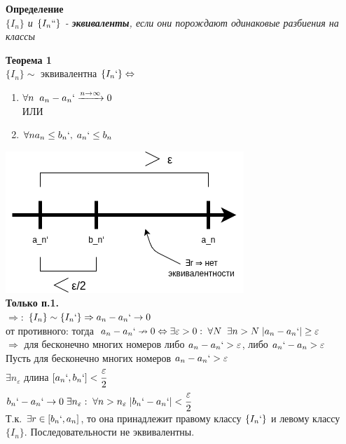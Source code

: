 \documentclass[12pt, a4paper]{article}
\newcommand{\eps}{\varepsilon}
\begin{document}
\begin{centering}
\begin{tcolorbox}
\textbf{Определение}\\
\textit{$\{I_n\}$ и $\{I_n``\}$ - \textbf{эквиваленты}, если они порождают одинаковые разбиения на классы}
\end{tcolorbox}

\begin{tcolorbox}
\textbf{Теорема 1}\\
$\{ I_n \}\sim$ эквивалентна $\{ I_n` \} \Leftrightarrow$
\begin{enumerate}
    \item $\forall n \;\; a_n - a_n` \xrightarrow{n \to \infty} 0 $\\
    ИЛИ
    \item $\forall n a_n \leq b_n`,\; a_n` \leq b_n$
\end{enumerate}
\end{tcolorbox}

\begin{tcolorbox}[title=Доказательство Т1, breakable]
\includegraphics[width=0.4\linewidth]{images/Дедекиндовы сечения/Доказательство Т1.png}\\
\textbf{Только п.1.} \\
$\Rightarrow$: $\{ I_n \} \sim \{ I_n` \} \Rightarrow a_n-a_n` \rightarrow 0$\\
от противного: тогда $a_n-a_n` \nrightarrow 0 \Leftrightarrow \\ 
\exists \eps>0:\; \forall N\;\; \exists n > N\; |a_n - a_n`| \geq \eps $ \\
$\Rightarrow $ для бесконечно многих номеров либо $a_n-a_n` > \eps$, либо $a_n` - a_n > \eps$\\
Пусть для бесконечно многих номеров $a_n - a_n` > \eps$ \\
$\exists n_\eps$ длина $[a_n`, b_n`] < \cfrac{\eps}{2}$\\
$b_n`-a_n` \rightarrow 0 \; \exists n_\eps: \; \forall n > n_\eps\; |b_n`-a_n`| < \cfrac{\eps}{2}$\\
Т.к. $\exists r \in [b_n`, a_n]$, то она принадлежит правому классу $\{I_n`\}$ и левому классу $\{I_n\}$. Последовательности не эквивалентны.\\


\end{tcolorbox}
\end{centering}
\end{document}

